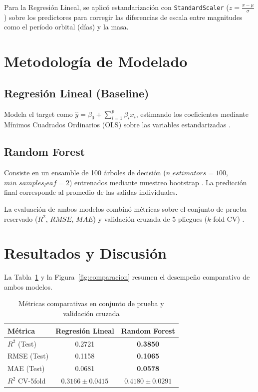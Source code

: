 \documentclass[10pt,journal]{IEEEtran}
\begin{document}
  Para la Regresi\'on Lineal, se aplic\'o estandarizaci\'on con \texttt{StandardScaler} ($z = \frac{x - \mu}{\sigma}$) sobre los predictores para corregir las diferencias de escala entre magnitudes como el per\'iodo orbital (d\'ias) y la masa.

  \section{Metodolog\'ia de Modelado}

  \subsection{Regresi\'on Lineal (Baseline)}
  Modela el target como $\hat{y} = \beta_0 + \sum_{i=1}^{p} \beta_i x_i$, estimando los coeficientes mediante M\'inimos Cuadrados Ordinarios (OLS) sobre las variables estandarizadas \cite{hastie2009}.

  \subsection{Random Forest}
  Consiste en un ensamble de 100 \'arboles de decisi\'on ($n\_estimators=100$, $min\_samples_leaf=2$) entrenados mediante muestreo bootstrap \cite{breiman2001, amat_rodrigo_2026}. La predicci\'on final corresponde al promedio de las salidas individuales.

  La evaluaci\'on de ambos modelos combin\'o m\'etricas sobre el conjunto de prueba reservado ($R^2$, $RMSE$, $MAE$) y validaci\'on cruzada de 5 pliegues ($k$-fold CV) \cite{pedregosa2011}.

  \section{Resultados y Discusi\'on}

  La Tabla~\ref{tab:resultados} y la Figura~\ref{fig:comparacion} resumen el desempe\~no comparativo de ambos modelos.

  \begin{table}[H]
    \caption{M\'etricas comparativas en conjunto de prueba y validaci\'on cruzada}
    \label{tab:resultados}
    \centering
    \begin{tabular}{lcc}
      \toprule
      \textbf{M\'etrica} & \textbf{Regresi\'on Lineal} & \textbf{Random Forest} \\
      \midrule
      $R^2$ (Test)             & 0.2721 & \textbf{0.3850} \\
      RMSE (Test)              & 0.1158 & \textbf{0.1065} \\
      MAE (Test)               & 0.0681 & \textbf{0.0578} \\
      $R^2$ CV-5fold           & $0.3166 \pm 0.0415$ & $\mathbf{0.4180 \pm 0.0291}$ \\
      \bottomrule
    \end{tabular}
  \end{table}
\end{document}
